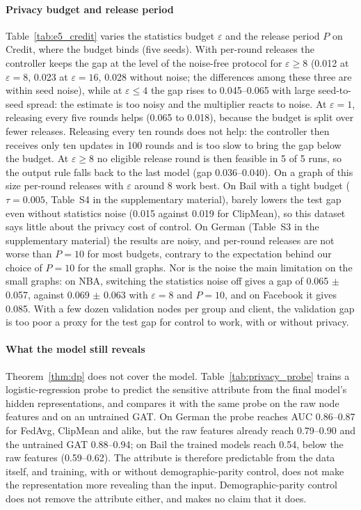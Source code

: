 \paragraph{Privacy budget and release period}

Table~\ref{tab:e5_credit} varies the statistics budget $\varepsilon$ and the release period $P$ on Credit, where the budget binds (five seeds). With per-round releases the controller keeps the gap at the level of the noise-free protocol for $\varepsilon\ge8$ (0.012 at $\varepsilon=8$, 0.023 at $\varepsilon=16$, 0.028 without noise; the differences among these three are within seed noise), while at $\varepsilon\le4$ the gap rises to 0.045--0.065 with large seed-to-seed spread: the estimate is too noisy and the multiplier reacts to noise. At $\varepsilon=1$, releasing every five rounds helps (0.065 to 0.018), because the budget is split over fewer releases. Releasing every ten rounds does not help: the controller then receives only ten updates in 100 rounds and is too slow to bring the gap below the budget. At $\varepsilon\ge8$ no eligible release round is then feasible in 5 of 5 runs, so the output rule falls back to the last model (gap 0.036--0.040). On a graph of this size per-round releases with $\varepsilon$ around 8 work best.
On Bail with a tight budget ($\tau=0.005$, Table~S4 in the supplementary material), \clamp{} barely lowers the test gap even without statistics noise (0.015 against 0.019 for ClipMean), so this dataset says little about the privacy cost of control. On German (Table~S3 in the supplementary material) the results are noisy, and per-round releases are not worse than $P=10$ for most budgets, contrary to the expectation behind our choice of $P=10$ for the small graphs. Nor is the noise the main limitation on the small graphs: on NBA, switching the statistics noise off gives a gap of 0.065 $\pm$ 0.057, against 0.069 $\pm$ 0.063 with $\varepsilon=8$ and $P=10$, and on Facebook it gives 0.085. With a few dozen validation nodes per group and client, the validation gap is too poor a proxy for the test gap for control to work, with or without privacy.

\paragraph{What the model still reveals}

Theorem~\ref{thm:dp} does not cover the model. Table~\ref{tab:privacy_probe} trains a logistic-regression probe to predict the sensitive attribute from the final model's hidden representations, and compares it with the same probe on the raw node features and on an untrained GAT. On German the probe reaches AUC 0.86--0.87 for FedAvg, ClipMean and \clamp{} alike, but the raw features already reach 0.79--0.90 and the untrained GAT 0.88--0.94; on Bail the trained models reach 0.54, below the raw features (0.59--0.62). The attribute is therefore predictable from the data itself, and training, with or without demographic-parity control, does not make the representation more revealing than the input. Demographic-parity control does not remove the attribute either, and \clamp{} makes no claim that it does.

